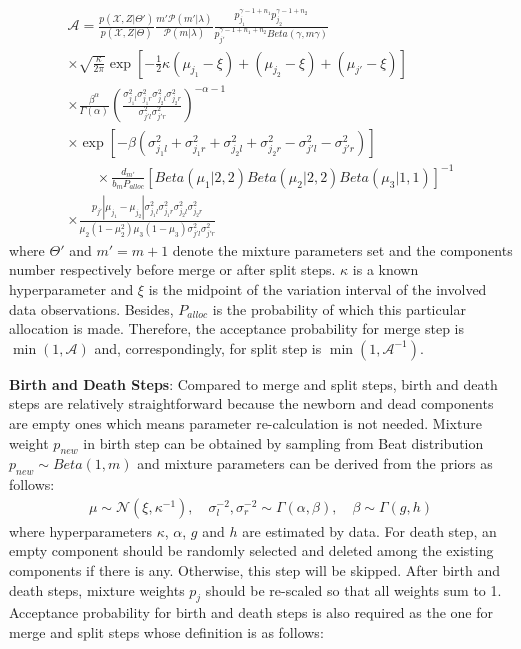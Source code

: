 \documentclass[conference]{IEEEtran}
\begin{document}
\begin{multline}
\mathcal{A}=\frac{p(\mathcal{X},Z|\Theta')}{p(\mathcal{X},Z|\Theta)}\frac{m'\mathcal{P}(m'|\lambda)}{\mathcal{P}(m|\lambda)}\frac{p_{j_1}^{\gamma-1+n_1}p_{j_2}^{\gamma-1+n_2}}{p_{j'}^{\gamma-1+n_1+n_2}Beta(\gamma,m\gamma)} \\
\times \sqrt{\frac{\kappa}{2\pi}} \exp[-\frac{1}{2}\kappa{(\mu_{j_1}-\xi)+(\mu_{j_2}-\xi)+(\mu_{j'}-\xi)}] \\
\times \frac{\beta^{\alpha}}{\Gamma(\alpha)}(\frac{\sigma_{j_1l}^2\sigma_{j_1r}^2\sigma_{j_2l}^2\sigma_{j_2r}^2}{\sigma_{j'l}^2\sigma_{j'r}^2})^{-\alpha-1} \qquad\qquad\qquad\qquad\\
\times \exp [{-\beta(\sigma_{j_1l}^2+\sigma_{j_1r}^2+\sigma_{j_2l}^2+\sigma_{j_2r}^2-\sigma_{j'l}^2-\sigma_{j'r}^2)}] \\
\qquad\times \frac{d_{m'}}{b_mP_{alloc}} [Beta(\mu_1|2,2)Beta(\mu_2|2,2)Beta(\mu_3|1,1)]^{-1} \\
\times \frac{p_{j'}|\mu_{j_1}-\mu_{j_2}|\sigma_{j_1l}^2\sigma_{j_1r}^2\sigma_{j_2l}^2\sigma_{j_2r}^2}{\mu_2(1-\mu_2^2)\mu_3(1-\mu_3)\sigma_{j'l}^2\sigma_{j'r}^2} \qquad\qquad\qquad\quad
\label{eq:acptProMS}
\end{multline}
where $\Theta'$ and $m' = m + 1$ denote the mixture parameters set and the components number respectively before merge or after split steps. $\kappa$ is a known hyperparameter and $\xi$ is the midpoint of the variation interval of the involved data observations. Besides, $P_{alloc}$ is the probability of which this particular allocation is made. Therefore, the acceptance probability for merge step is $\min(1,\mathcal{A})$ and, correspondingly, for split step is $\min(1,\mathcal{A}^{-1})$.

\textbf{Birth and Death Steps}: Compared to merge and split steps, birth and death steps are relatively straightforward because the newborn and dead components are empty ones which means parameter re-calculation is not needed. Mixture weight $p_{new}$ in birth step can be obtained by sampling from Beat distribution $p_{new} \sim Beta(1,m)$ and mixture parameters can be derived from the priors as follows\cite{Casella2004}:
\begin{align}
\mu \sim \mathcal{N}(\xi,\kappa^{-1}), \quad \sigma_{l}^{-2},\sigma_{r}^{-2} \sim \Gamma(\alpha,\beta), \quad \beta \sim \Gamma(g,h)
\label{eq:prior}
\end{align}
where hyperparameters $\kappa$, $\alpha$, $g$ and $h$ are estimated by data. For death step, an empty component should be randomly selected and deleted among the existing components if there is any. Otherwise, this step will be skipped. After birth and death steps, mixture weights $p_j$ should be re-scaled so that all weights sum to 1. Acceptance probability for birth and death steps is also required as the one for merge and split steps whose definition is as follows:
\end{document}
